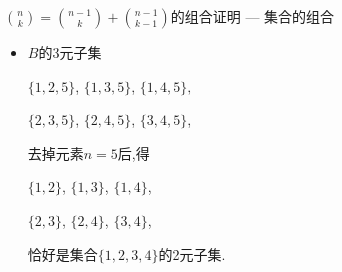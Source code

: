 \documentclass[punct]{ctexbeamer}
\begin{document}
\begin{frame}{$\binom{n}{k}=\binom{n-1}{k}+\binom{n-1}{k-1}$的组合证明 --- 集合的组合}
\begin{minipage}{0.49\linewidth}
\begin{flushleft}
\begin{itemize}
                \item  \small{$B$的3元子集

                    \begin{center}
                        $\{1,2,5\}$, $\{1,3,5\}$, $\{1,4,5\},$

                        $\{2,3,5\}$, $\{2,4,5\}$, $\{3,4,5\}$,
                    \end{center}


                    去掉元素$n=5$后,得

                    \begin{center}
                        $\{1,2\}$, $\{1,3\}$, $\{1,4\}$,

                        $\{2,3\}$, $\{2,4\}$, $\{3,4\}$,
                    \end{center}

                    恰好是集合$\{1,2,3,4\}$的2元子集.}
            \end{itemize}

        \end{flushleft}
    \end{minipage}


\end{frame}
\end{document}
